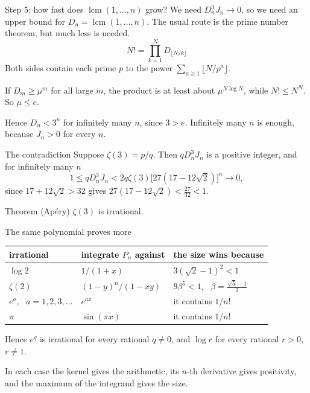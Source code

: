 \documentclass[aspectratio=169,11pt]{beamer}
\newcommand{\Dn}{D_n}
\DeclareMathOperator{\lcm}{lcm}
\begin{document}
\begin{frame}{Step 5: how fast does $\lcm(1,\dots,n)$ grow?}
  We need $\Dn^3J_n\to0$, so we need an upper bound for $\Dn=\lcm(1,\dots,n)$. The usual
  route is the prime number theorem, but much less is needed.
  \[
    N!=\prod_{k=1}^ND_{\lfloor N/k\rfloor}
  \]
  Both sides contain each prime $p$ to the power $\sum_{a\ge1}\lfloor N/p^a\rfloor$.
  \medskip

  If $D_m\ge\mu^m$ for all large $m$, the product is at least about $\mu^{N\log N}$, while
  $N!\le N^N$. So $\mu\le e$.
  \medskip

  Hence $\Dn<3^n$ for \alert{infinitely many} $n$, since $3>e$. Infinitely many $n$ is enough,
  because $J_n>0$ for every $n$.
\end{frame}

\begin{frame}{The contradiction}
  Suppose $\zeta(3)=p/q$. Then $q\Dn^3J_n$ is a \alert{positive integer}, and for infinitely many $n$
  \[
    1\le q\Dn^3J_n<2q\zeta(3)\bigl[27(17-12\sqrt2)\bigr]^n\longrightarrow0,
  \]
  since $17+12\sqrt2>32$ gives $27(17-12\sqrt2)<\tfrac{27}{32}<1$.
  \begin{alertblock}{Theorem (Ap\'ery)}
    $\zeta(3)$ is irrational.
  \end{alertblock}
\end{frame}

\begin{frame}{The same polynomial proves more}
  \centering
  \renewcommand{\arraystretch}{1.35}
  \begin{tabular}{@{}l@{\qquad}l@{\qquad}l@{}}
    \toprule
    irrational & integrate $P_n$ against & the size wins because\\
    \midrule
    \alert{$\log2$} & $1/(1+x)$ & $3(\sqrt2-1)^2<1$\\
    \alert{$\zeta(2)$} & $(1-y)^n/(1-xy)$ & $9\beta^5<1$, \ $\beta=\frac{\sqrt5-1}2$\\
    \alert{$e^a$}, \ $a=1,2,3,\dots$ & $e^{ax}$ & it contains $1/n!$\\
    \alert{$\pi$} & $\sin(\pi x)$ & it contains $1/n!$\\
    \bottomrule
  \end{tabular}
  \medskip

  \raggedright
  Hence $e^q$ is irrational for every rational $q\ne0$, and $\log r$ for every rational $r>0$, $r\ne1$.
  \medskip

  In each case the kernel gives the arithmetic, its $n$-th derivative gives positivity, and the
  maximum of the integrand gives the size.
\end{frame}
\end{document}
